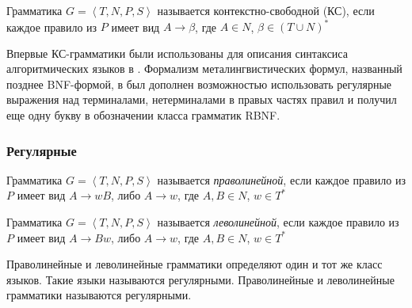 Грамматика $G = \left\langle {T, N, P, S} \right\rangle$ называется контекстно-свободной (КС),
если каждое правило из $P$ имеет вид $A \rightarrow \beta$, где $A \in N$,
$\beta \in (T \cup N)^{*}$

Впервые КС-грамматики были использованы для описания синтаксиса алгоритмических 
языков в \cite{bib22}. Формализм металингвистических формул, названный позднее BNF-формой, 
в \cite{bib23} был дополнен возможностью использовать регулярные выражения над терминалами, 
нетерминалами в правых частях правил и получил еще одну букву в обозначении класса грамматик RBNF. 

\subsubsection{Регулярные}

Грамматика $G = \left\langle {T, N, P, S} \right\rangle$ называется \textit{праволинейной},
если каждое правило из $P$ имеет вид $A \rightarrow wB$, либо $A \rightarrow w$, 
где $A, B \in N$, $w \in T^{*}$ 

Грамматика $G = \left\langle {T, N, P, S} \right\rangle$ называется \textit{леволинейной},
если каждое правило из $P$ имеет вид $A \rightarrow Bw$, либо $A \rightarrow w$, 
где $A, B \in N$, $w \in T^{*}$ 

Праволинейные и леволинейные грамматики определяют один и тот же класс языков. 
Такие языки называются регулярными. 
Праволинейные и леволинейные грамматики называются регулярными.






